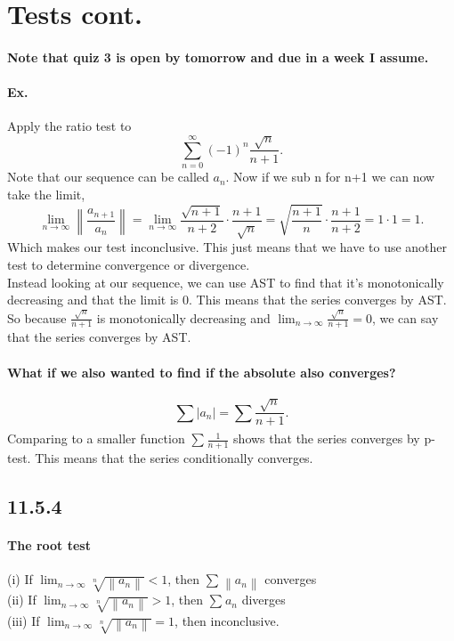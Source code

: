 \section*{Tests cont.}%
\label{sec:Tests}
\paragraph{Note that quiz 3 is open by tomorrow and due in a week I assume.}

\paragraph{Ex.}
Apply the ratio test to 
\[
\sum_{ n=0 } ^{ \infty } \left( -1 \right) ^{ n }\frac{ \sqrt{ n} }{ n+1 }
.\] 
Note that our sequence can be called $ a_n $. Now if we sub n for n+1 we can now take the limit,
\[
\lim_{ n \to \infty} \left\| \frac{ a_{ n+1 } }{ a_n } \right\| = \lim_{ n \to \infty} \frac{ \sqrt{ n+1} }{ n+2 }\cdot \frac{ n+1 }{ \sqrt{ n} }= \sqrt{ \frac{ n+1 }{ n }} \cdot \frac{ n+1 }{ n+2 } = 1\cdot 1 = 1
.\] 
Which makes our test inconclusive. This just means that we have to use another test to determine convergence or divergence. \\
Instead looking at our sequence, we can use AST to find that it's monotonically decreasing and that the limit is 0. This means that the series converges by AST. So because $ \frac{ \sqrt{ n} }{ n+1 } $ is monotonically decreasing and $ \lim_{ n \to \infty} \frac{ \sqrt{ n} }{ n+1 } = 0 $, we can say that the series converges by AST.

\paragraph{What if we also wanted to find if the absolute also converges?}
\[
\sum_{ } ^{  } |a_n| = \sum_{  } ^{  } \frac{ \sqrt{ n} }{ n+1 }
.\] 
Comparing to a smaller function $ \sum_{  } ^{  } \frac{ 1 }{ n+1 } $ shows that the series converges by p-test. This means that the series conditionally converges.
\subsection*{11.5.4}%
\label{sub:11.5.4}
\paragraph{The root test }
(i) If $ \lim_{ n \to \infty} \sqrt[ n ]{ \left\| a_n \right\| } <1 $, then $ \sum_{  } ^{  } \left\| a_n \right\| $ converges \\
(ii) If $ \lim_{ n \to \infty} \sqrt[ n ]{ \left\| a_n \right\| } >1 $, then $ \sum_{  } ^{  } a_n $ diverges \\
(iii) If $ \lim_{ n \to \infty} \sqrt[ n ]{ \left\| a_n \right\| } =1 $, then inconclusive. \\ \\ 
